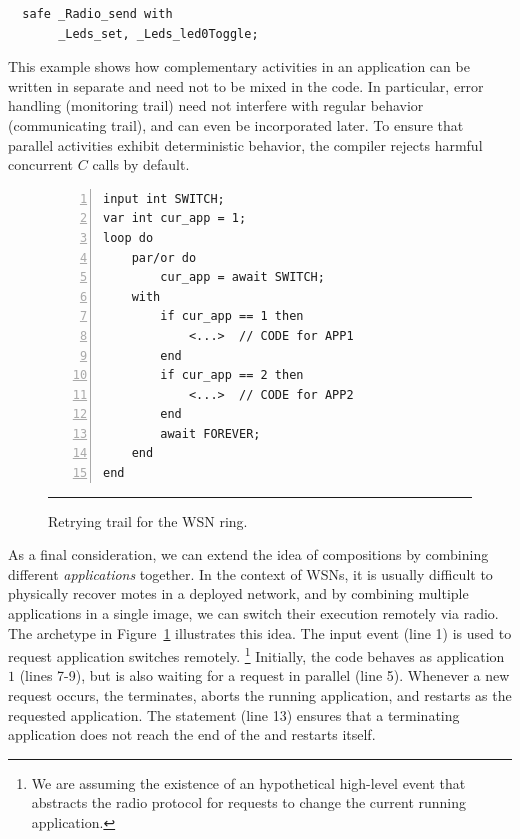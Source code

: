 \begin{lstlisting}
  safe _Radio_send with
       _Leds_set, _Leds_led0Toggle;
\end{lstlisting}

This example shows how complementary activities in an application can be 
written in separate and need not to be mixed in the code.
In particular, error handling (monitoring trail) need not interfere with 
regular behavior (communicating trail), and can even be incorporated later.
To ensure that parallel activities exhibit deterministic behavior, the \CEU 
compiler rejects harmful concurrent $C$ calls by default.

\begin{figure}[ht]
\begin{lstlisting}[numbers=left,xleftmargin=2em]
input int SWITCH;
var int cur_app = 1;
loop do
    par/or do
        cur_app = await SWITCH;
    with
        if cur_app == 1 then
            <...>  // CODE for APP1
        end
        if cur_app == 2 then
            <...>  // CODE for APP2
        end
        await FOREVER;
    end
end
\end{lstlisting}
\rule{14cm}{0.37pt}
\caption{ Retrying trail for the WSN ring.%
{\small %
}%
\label{lst.app}
}
\end{figure}

As a final consideration, we can extend the idea of compositions by combining 
different \emph{applications} together.
In the context of WSNs, it is usually difficult to physically recover motes in 
a deployed network, and by combining multiple applications in a single image, 
we can switch their execution remotely via radio.
%
The archetype in Figure~\ref{lst.app} illustrates this idea.
%
The input event  (line 1) is used to request application switches 
remotely.%
\footnote{ We are assuming the existence of an hypothetical high-level event 
 that abstracts the radio protocol for requests to change the 
current running application. }
Initially, the code behaves as application $1$ (lines 7-9), but is also waiting 
for a  request in parallel (line 5).
Whenever a new request occurs, the  terminates, aborts the running 
application, and restarts as the requested application.
The statement  (line 13) ensures that a terminating 
application does not reach the end of the  and restarts itself.

